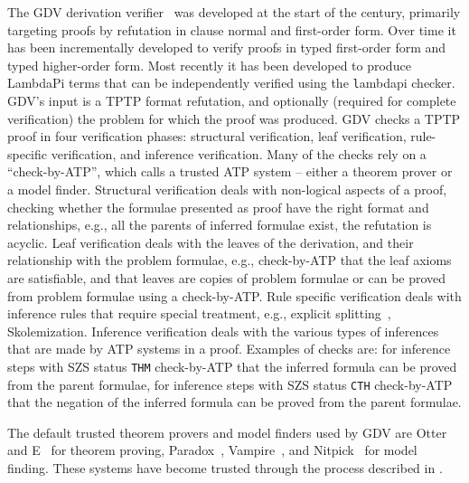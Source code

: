 \documentclass[runningheads]{llncs}
\newcommand{\smalltt}[1]{\small \texttt{#1}}
\begin{document}
The GDV derivation verifier~\cite{Sut06} was developed at the start of the century, primarily
targeting proofs by refutation in clause normal and first-order form.
Over time it has been incrementally developed to verify proofs in typed first-order form and
typed higher-order form.
Most recently it has been developed to produce LambdaPi 
terms that can be independently verified using the {\smalltt lambdapi} checker.~\cite{SBB25}
GDV's input is a TPTP format refutation, and optionally (required for complete verification) the 
problem for which the proof was produced.
GDV checks a TPTP proof in four verification phases: structural verification, leaf verification,
rule-specific verification, and inference verification.
Many of the checks rely on a ``check-by-ATP'', which calls a trusted ATP system -- either a theorem 
prover or a model finder.
Structural verification deals with non-logical aspects of a proof, checking whether the
formulae presented as proof have the right format and relationships, e.g., all the parents of 
inferred formulae exist, the refutation is acyclic. 
Leaf verification deals with the leaves of the derivation, and their relationship with
the problem formulae, e.g., check-by-ATP that the leaf axioms are satisfiable, and that leaves 
are copies of problem formulae or can be proved from problem formulae using a check-by-ATP.
Rule specific verification deals with inference rules that require special treatment, e.g.,
explicit splitting~\cite{Wei01}, Skolemization. 
Inference verification deals with the various types of inferences that are made by ATP
systems in a proof.
Examples of checks are: for inference steps with SZS status {\smalltt{THM}} check-by-ATP that the 
inferred formula can be proved from the parent formulae, for inference steps with SZS status 
{\smalltt{CTH}} check-by-ATP that the negation of the inferred formula can be proved from the parent 
formulae.


The default trusted theorem provers and model finders used by GDV are Otter~\cite{McC03-Otter}
and E~\cite{SCV19} for theorem proving, Paradox~\cite{CS18}, Vampire~\cite{KV13}, and
Nitpick~\cite{BN10-ITP} for model finding.
These systems have become trusted through the process described in \cite{SBB25}.
\end{document}
